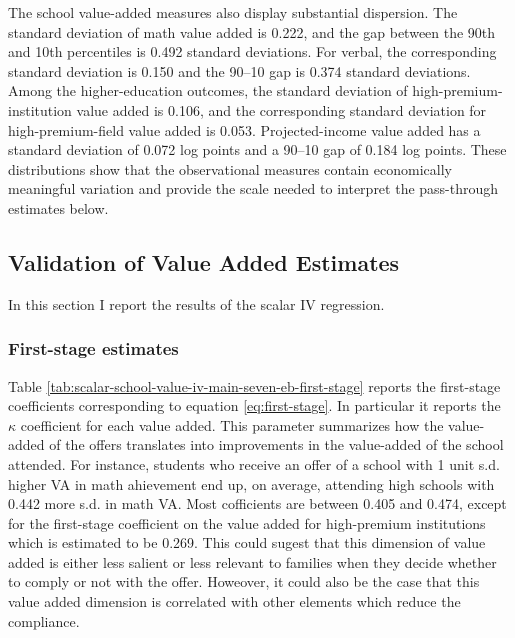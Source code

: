 \documentclass[a4paper, article, english, oneside, unknownkeysallowed, 12pt]{memoir}
\begin{document}
The school value-added measures also display substantial dispersion.
The standard deviation of math value added is 0.222, and the gap between the 90th and 10th percentiles is 0.492 standard deviations.
For verbal, the corresponding standard deviation is 0.150 and the 90--10 gap is 0.374 standard deviations.
Among the higher-education outcomes, the standard deviation of high-premium-institution value added is 0.106, and the corresponding standard deviation for high-premium-field value added is 0.053.
Projected-income value added has a standard deviation of 0.072 log points and a 90--10 gap of 0.184 log points.
These distributions show that the observational measures contain economically meaningful variation and provide the scale needed to interpret the pass-through estimates below.

\subsection{Validation of Value Added Estimates}

In this section I report the results of the scalar IV regression. 

\subsubsection{First-stage estimates}

Table \ref{tab:scalar-school-value-iv-main-seven-eb-first-stage} reports the first-stage coefficients corresponding to equation \ref{eq:first-stage}. 
In particular it reports the $\kappa$ coefficient for each value added.
This parameter summarizes how the value-added of the offers translates into improvements in the value-added of the school attended. 
For instance, students who receive an offer of a school with 1 unit s.d. higher VA in math ahievement end up, on average, attending high schools with 0.442 more s.d. in math VA. 
Most cofficients are between 0.405 and 0.474, except for the first-stage coefficient on the value added for high-premium institutions which is estimated to be 0.269. 
This could sugest that this dimension of value added is either less salient or less relevant to families when they decide whether to comply or not with the offer. 
Howeover, it could also be the case that this value added dimension is correlated with other elements which reduce the compliance. 
\end{document}
